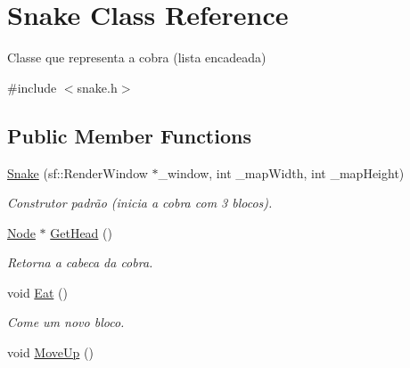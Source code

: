 \hypertarget{class_snake}{}\section{Snake Class Reference}
\label{class_snake}


Classe que representa a cobra (lista encadeada)  




{\ttfamily \#include $<$snake.\+h$>$}

\subsection*{Public Member Functions}
\begin{DoxyCompactItemize}
\item 
\hypertarget{class_snake_aefceed7b47e050449fdf20745f72ad2e}{}\hyperlink{class_snake_aefceed7b47e050449fdf20745f72ad2e}{Snake} (sf\+::\+Render\+Window $\ast$\+\_\+window, int \+\_\+map\+Width, int \+\_\+map\+Height)\label{class_snake_aefceed7b47e050449fdf20745f72ad2e}

\begin{DoxyCompactList}\small\item\em Construtor padrão (inicia a cobra com 3 blocos). \end{DoxyCompactList}\item 
\hypertarget{class_snake_a20d5e967eb3a52c7f02af6be9a755988}{}\hyperlink{struct_node}{Node} $\ast$ \hyperlink{class_snake_a20d5e967eb3a52c7f02af6be9a755988}{Get\+Head} ()\label{class_snake_a20d5e967eb3a52c7f02af6be9a755988}

\begin{DoxyCompactList}\small\item\em Retorna a cabeca da cobra. \end{DoxyCompactList}\item 
\hypertarget{class_snake_aaa8d420e2cd8fbe71aac254eadbdc4da}{}void \hyperlink{class_snake_aaa8d420e2cd8fbe71aac254eadbdc4da}{Eat} ()\label{class_snake_aaa8d420e2cd8fbe71aac254eadbdc4da}

\begin{DoxyCompactList}\small\item\em Come um novo bloco. \end{DoxyCompactList}\item 
\hypertarget{class_snake_acb23448fc5e2c38648c4b3280e42edc9}{}void \hyperlink{class_snake_acb23448fc5e2c38648c4b3280e42edc9}{Move\+Up} ()\label{class_snake_acb23448fc5e2c38648c4b3280e42edc9}


\end{DoxyCompactItemize}
